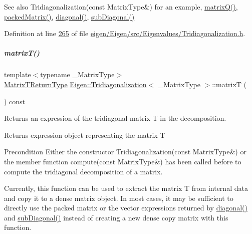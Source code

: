 \begin{DoxySeeAlso}{See also}
Tridiagonalization(const Matrix\+Type\&) for an example, \hyperlink{group___eigenvalues___module_a000f7392eda930576ffd2af1fae54af2}{matrix\+Q()}, \hyperlink{group___eigenvalues___module_a47858b3895e64acafb1bb2e97f98a154}{packed\+Matrix()}, \hyperlink{group___eigenvalues___module_a0b7ff4860aa6f7c0761b1059c012fd8e}{diagonal()}, \hyperlink{group___eigenvalues___module_ac423dbb91157c159bdcb4b5a8371232e}{sub\+Diagonal()} 
\end{DoxySeeAlso}


Definition at line \hyperlink{eigen_2_eigen_2src_2_eigenvalues_2_tridiagonalization_8h_source_l00265}{265} of file \hyperlink{eigen_2_eigen_2src_2_eigenvalues_2_tridiagonalization_8h_source}{eigen/\+Eigen/src/\+Eigenvalues/\+Tridiagonalization.\+h}.

\mbox{\label{group___eigenvalues___module_a6eb5ef94b8b9bb013c0e69b6df56d0df}} 
\subparagraph{\texorpdfstring{matrix\+T()}{matrixT()}\hspace{0.1cm}{\footnotesize\ttfamily [2/2]}}
{\footnotesize\ttfamily template$<$typename \+\_\+\+Matrix\+Type$>$ \\
\hyperlink{struct_eigen_1_1internal_1_1_tridiagonalization_matrix_t_return_type}{Matrix\+T\+Return\+Type} \hyperlink{group___eigenvalues___module_class_eigen_1_1_tridiagonalization}{Eigen\+::\+Tridiagonalization}$<$ \+\_\+\+Matrix\+Type $>$\+::matrixT (\begin{DoxyParamCaption}{ }\end{DoxyParamCaption}) const\hspace{0.3cm}{\ttfamily [inline]}}



Returns an expression of the tridiagonal matrix T in the decomposition. 

\begin{DoxyReturn}{Returns}
expression object representing the matrix T
\end{DoxyReturn}
\begin{DoxyPrecond}{Precondition}
Either the constructor Tridiagonalization(const Matrix\+Type\&) or the member function compute(const Matrix\+Type\&) has been called before to compute the tridiagonal decomposition of a matrix.
\end{DoxyPrecond}
Currently, this function can be used to extract the matrix T from internal data and copy it to a dense matrix object. In most cases, it may be sufficient to directly use the packed matrix or the vector expressions returned by \hyperlink{group___eigenvalues___module_a0b7ff4860aa6f7c0761b1059c012fd8e}{diagonal()} and \hyperlink{group___eigenvalues___module_ac423dbb91157c159bdcb4b5a8371232e}{sub\+Diagonal()} instead of creating a new dense copy matrix with this function.

